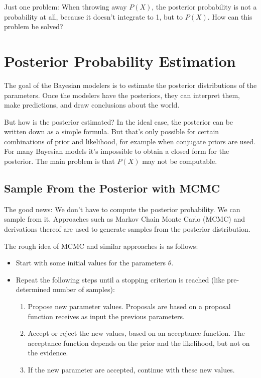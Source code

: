 \documentclass[
  10pt,
]{scrbook}
\providecommand{\tightlist}{%
  \setlength{\itemsep}{0pt}\setlength{\parskip}{0pt}}
\begin{document}
Just one problem: When throwing away \(P(X)\), the posterior probability is not a probability at all, because it doesn't integrate to 1, but to \(P(X)\).
How can this problem be solved?

\hypertarget{posterior-probability-estimation}{%
\section{Posterior Probability Estimation}\label{posterior-probability-estimation}}

The goal of the Bayesian modelers is to estimate the posterior distributions of the parameters.
Once the modelers have the posteriors, they can interpret them, make predictions, and draw conclusions about the world.

But how is the posterior estimated?
In the ideal case, the posterior can be written down as a simple formula.
But that's only possible for certain combinations of prior and likelihood, for example when conjugate priors are used.
For many Bayesian models it's impossible to obtain a closed form for the posterior.
The main problem is that \(P(X)\) may not be computable.

\hypertarget{sample-from-the-posterior-with-mcmc}{%
\subsection*{Sample From the Posterior with MCMC}\label{sample-from-the-posterior-with-mcmc}}


The good news: We don't have to compute the posterior probability.
We can sample from it.
Approaches such as Markov Chain Monte Carlo (MCMC) and derivations thereof are used to generate samples from the posterior distribution.

The rough idea of MCMC and similar approaches is as follows:

\begin{itemize}
\tightlist
\item
  Start with some initial values for the parameters \(\theta\).
\item
  Repeat the following steps until a stopping criterion is reached (like pre-determined number of samples):

  \begin{enumerate}
  \def\labelenumi{\arabic{enumi}.}
  \tightlist
  \item
    Propose new parameter values. Proposals are based on a proposal function receives as input the previous parameters.
  \item
    Accept or reject the new values, based on an acceptance function. The acceptance function depends on the prior and the likelihood, but not on the evidence.
  \item
    If the new parameter are accepted, continue with these new values.
  \end{enumerate}
\end{itemize}
\end{document}
